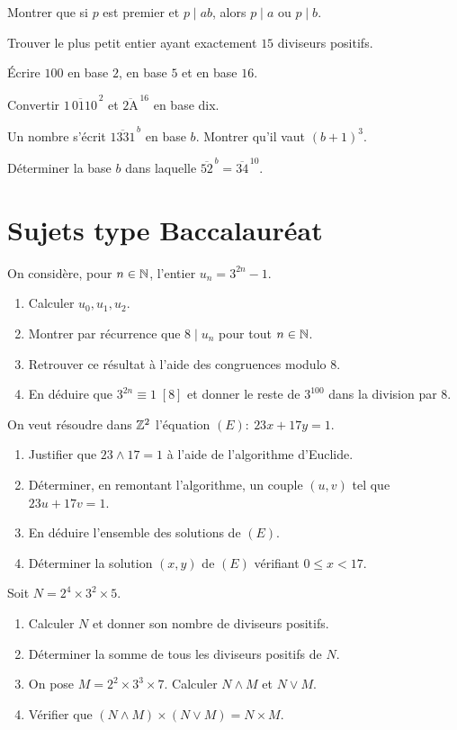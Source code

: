 \exo{} Montrer que si $p$ est premier et $p\mid ab$, alors $p\mid a$ ou $p\mid b$.

\exo{} Trouver le plus petit entier ayant exactement $15$ diviseurs positifs.

\exo{} Écrire $100$ en base $2$, en base $5$ et en base $16$.

\exo{} Convertir $\overline{1\,0110}^{\,2}$ et $\overline{\text{2A}}^{\,16}$ en base dix.

\exo{} Un nombre s'écrit $\overline{1331}^{\,b}$ en base $b$. Montrer qu'il vaut $(b+1)^3$.

\exo{} Déterminer la base $b$ dans laquelle $\overline{52}^{\,b}=\overline{34}^{\,10}$.

\section{Sujets type Baccalauréat}

On considère, pour $n\in\mathbb{N}$, l'entier $u_n=3^{2n}-1$.
\begin{enumerate}[label=\arabic*)]
\item Calculer $u_0,u_1,u_2$.
\item Montrer par récurrence que $8\mid u_n$ pour tout $n\in\mathbb{N}$.
\item Retrouver ce résultat à l'aide des congruences modulo $8$.
\item En déduire que $3^{2n}\equiv 1\;[8]$ et donner le reste de $3^{100}$ dans la division par $8$.
\end{enumerate}

On veut résoudre dans $\mathbb{Z}^2$ l'équation $(E):\ 23x+17y=1$.
\begin{enumerate}[label=\arabic*)]
\item Justifier que $23\wedge17=1$ à l'aide de l'algorithme d'Euclide.
\item Déterminer, en remontant l'algorithme, un couple $(u,v)$ tel que $23u+17v=1$.
\item En déduire l'ensemble des solutions de $(E)$.
\item Déterminer la solution $(x,y)$ de $(E)$ vérifiant $0\le x<17$.
\end{enumerate}

Soit $N=2^{4}\times 3^{2}\times 5$.
\begin{enumerate}[label=\arabic*)]
\item Calculer $N$ et donner son nombre de diviseurs positifs.
\item Déterminer la somme de tous les diviseurs positifs de $N$.
\item On pose $M=2^{2}\times 3^{3}\times 7$. Calculer $N\wedge M$ et $N\vee M$.
\item Vérifier que $(N\wedge M)\times(N\vee M)=N\times M$.
\end{enumerate}


